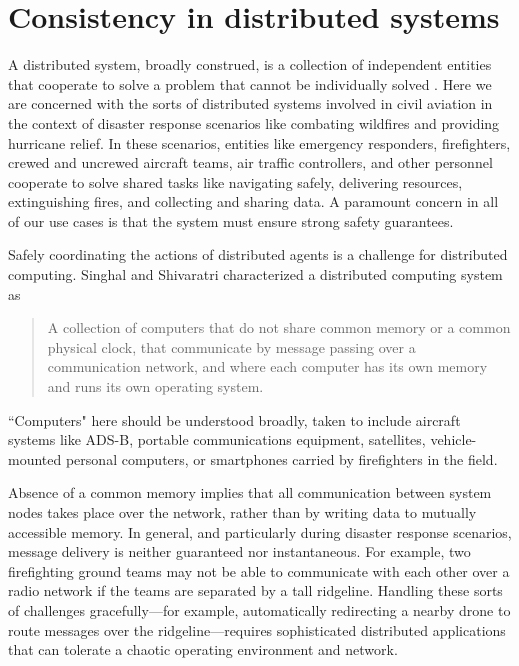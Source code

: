 \section{Consistency in distributed systems}
\label{sec:distrsys}

A distributed system, broadly construed, is a collection of
independent entities that cooperate to solve a problem that cannot be
individually solved \cite{kshemkalyani_singhal_2008}. Here we are
concerned with the sorts of distributed systems involved in civil
aviation in the context of disaster response scenarios like combating
wildfires and providing hurricane relief. In these scenarios, entities
like emergency responders, firefighters, crewed and uncrewed aircraft
teams, air traffic controllers, and other personnel cooperate to solve
shared tasks like navigating safely, delivering resources,
extinguishing fires, and collecting and sharing data. A paramount
concern in all of our use cases is that the system must ensure strong
safety guarantees.

Safely coordinating the actions of distributed agents is a challenge
for distributed computing. Singhal and Shivaratri
\cite{10.5555/562065} characterized a distributed computing system as
\begin{quotation}
  A collection of computers that do not share common memory or a
  common physical clock, that communicate by message passing over a
  communication network, and where each computer has its own memory
  and runs its own operating system.
\end{quotation}
``Computers" here should be understood broadly, taken to include
aircraft systems like ADS-B, portable communications equipment,
satellites, vehicle-mounted personal computers, or smartphones carried
by firefighters in the field.

Absence of a common memory implies that all communication between
system nodes takes place over the network, rather than by writing data
to mutually accessible memory. In general, and particularly during
disaster response scenarios, message delivery is neither guaranteed
nor instantaneous. For example, two firefighting ground teams may not
be able to communicate with each other over a radio network if the
teams are separated by a tall ridgeline. Handling these sorts of
challenges gracefully---for example, automatically redirecting a
nearby drone to route messages over the ridgeline---requires
sophisticated distributed applications that can tolerate a chaotic
operating environment and network.

